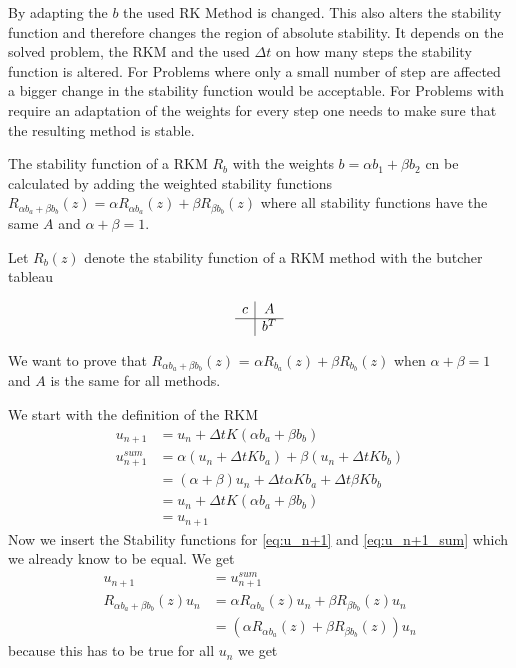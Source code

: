 \documentclass{article}
\begin{document}
By adapting the $b$ the used RK Method is changed. This also alters the stability function and therefore changes the region of absolute stability. 
It depends on the solved problem, the RKM and the used $\Delta t$ on how many steps the stability function is altered. For Problems where only a small number of step are affected a bigger change in the stability function would be acceptable. For Problems with require an adaptation of the weights for every step one needs to make sure that the resulting method is stable.


The stability function of a RKM $R_b$ with the weights $b = \alpha b_1 + \beta b_2$ cn be calculated by adding the weighted stability functions $R_{\alpha b_a+\beta b_b}(z) = \alpha R_{\alpha b_a}(z) + \beta R_{\beta b_b}(z) $ where all stability functions have the same $A$ and $\alpha + \beta = 1$.

Let $R_b(z)$ denote the stability function of a RKM method with the butcher tableau

$$
\begin{array}
{c|c}
c & A\\
\hline
& b^T
\end{array}
$$

We want to prove that $R_{\alpha b_a+\beta b_b}(z)$ = $\alpha R_{ b_a}(z)+\beta R_{b_b}(z)$ when $\alpha + \beta = 1$ and $A$ is the same for all methods.

We start with the definition of the RKM
\begin{align}
u_{n+1} &= u_n + \Delta t K (\alpha b_a+\beta b_b) \label{eq:u_n+1}  \\
u_{n+1}^{sum} &= \alpha (u_n + \Delta t K b_a) + \beta (u_n + \Delta t K b_b) \label{eq:u_n+1_sum} \\
& = (\alpha + \beta) u_n + \Delta t \alpha K b_a + \Delta t \beta K b_b \\
&= u_n + \Delta t K (\alpha b_a+\beta b_b) \\
&=u_{n+1} 
\end{align}
Now we insert the Stability functions for \ref{eq:u_n+1} and \ref{eq:u_n+1_sum} which we already know to be equal. We get 
\begin{align}
u_{n+1} &= u_{n+1}^{sum} \\
R_{\alpha b_a+\beta b_b}(z) u_n &= \alpha R_{\alpha b_a}(z) u_n + \beta R_{\beta b_b}(z) u_n \\
&= (\alpha R_{\alpha b_a}(z) + \beta R_{\beta b_b}(z)) u_n
\end{align}
because this has to be true for all $u_n$ we get
\end{document}
